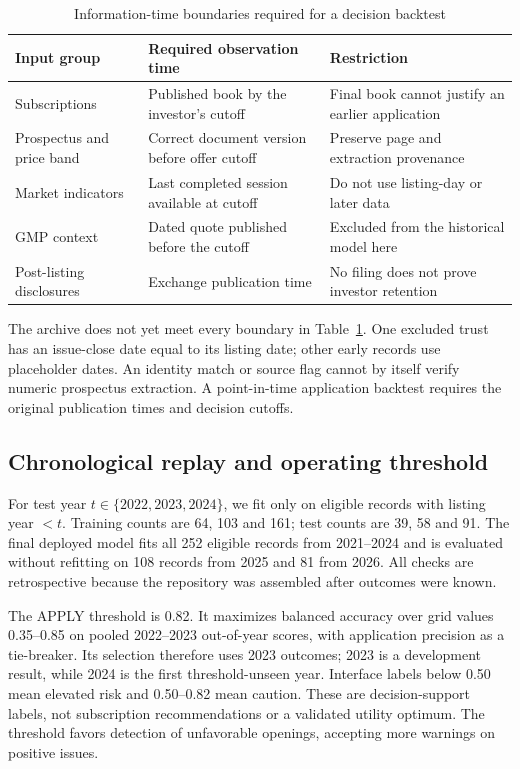 \documentclass[runningheads]{llncs}
\begin{document}
\begin{table}[tb]
\caption{Information-time boundaries required for a decision backtest}\label{tab:availability}
\centering\small
\begin{tabular}{@{}>{\raggedright\arraybackslash}p{.24\linewidth}>{\raggedright\arraybackslash}p{.33\linewidth}>{\raggedright\arraybackslash}p{.32\linewidth}@{}}
\toprule Input group & Required observation time & Restriction\\\midrule
Subscriptions & Published book by the investor's cutoff & Final book cannot justify an earlier application\\
Prospectus and price band & Correct document version before offer cutoff & Preserve page and extraction provenance\\
Market indicators & Last completed session available at cutoff & Do not use listing-day or later data\\
GMP context & Dated quote published before the cutoff & Excluded from the historical model here\\
Post-listing disclosures & Exchange publication time & No filing does not prove investor retention\\\bottomrule
\end{tabular}
\end{table}
The archive does not yet meet every boundary in Table~\ref{tab:availability}. One excluded trust has an issue-close date equal to its listing date; other early records use placeholder dates. An identity match or source flag cannot by itself verify numeric prospectus extraction. A point-in-time application backtest requires the original publication times and decision cutoffs.

\subsection{Chronological replay and operating threshold}
For test year $t\in\{2022,2023,2024\}$, we fit only on eligible records with listing year $<t$. Training counts are 64, 103 and 161; test counts are 39, 58 and 91. The final deployed model fits all 252 eligible records from 2021--2024 and is evaluated without refitting on 108 records from 2025 and 81 from 2026. All checks are retrospective because the repository was assembled after outcomes were known.

The APPLY threshold is 0.82. It maximizes balanced accuracy over grid values 0.35--0.85 on pooled 2022--2023 out-of-year scores, with application precision as a tie-breaker. Its selection therefore uses 2023 outcomes; 2023 is a development result, while 2024 is the first threshold-unseen year. Interface labels below 0.50 mean elevated risk and 0.50--0.82 mean caution. These are decision-support labels, not subscription recommendations or a validated utility optimum. The threshold favors detection of unfavorable openings, accepting more warnings on positive issues.
\end{document}
